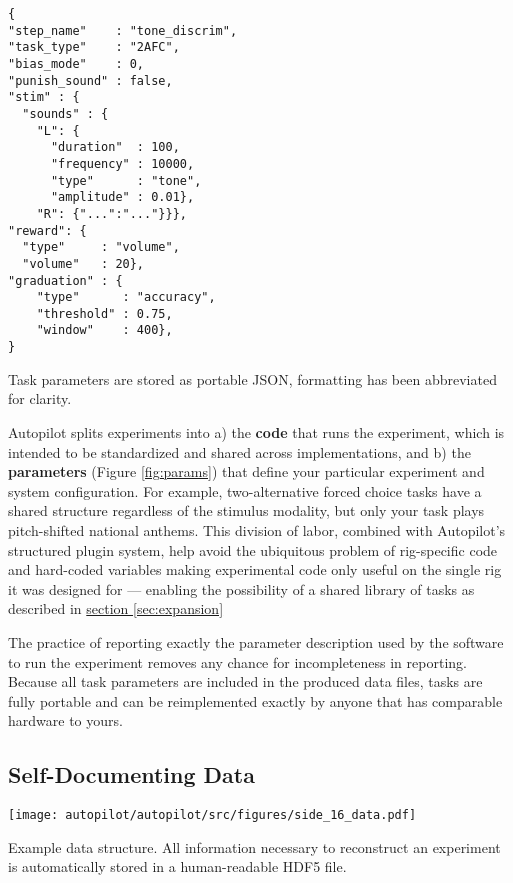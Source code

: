 %
\begin{marginfigure}[1.5cm]
\begin{verbatim}
{
"step_name"    : "tone_discrim",
"task_type"    : "2AFC",
"bias_mode"    : 0,
"punish_sound" : false,
"stim" : {
  "sounds" : {
    "L": {
      "duration"  : 100,
      "frequency" : 10000,
      "type"      : "tone",
      "amplitude" : 0.01},
    "R": {"...":"..."}}},
"reward": {
  "type"     : "volume",
  "volume"   : 20},
"graduation" : {
    "type"      : "accuracy",
    "threshold" : 0.75,
    "window"    : 400},
}
\end{verbatim}
\caption{Task parameters are stored as portable JSON, formatting has been abbreviated for clarity.}
\label{fig:params}
\end{marginfigure}%
%
%
Autopilot splits experiments into a) the \textbf{code} that runs the experiment, which is intended to be standardized and shared across implementations, and b) the \textbf{parameters} (Figure \ref{fig:params}) that define your particular experiment and system configuration. For example, two-alternative forced choice tasks have a shared structure regardless of the stimulus modality, but only your task plays pitch-shifted national anthems. This division of labor, combined with Autopilot's structured plugin system, help avoid the ubiquitous problem of rig-specific code and hard-coded variables making experimental code only useful on the single rig it was designed for --- enabling the possibility of a shared library of tasks as described in \hyperref[sec:expansion]{section \ref{sec:expansion}}%

The practice of reporting exactly the parameter description used by the software to run the experiment removes any chance for incompleteness in reporting. Because all task parameters are included in the produced data files, tasks are fully portable and can be reimplemented exactly by anyone that has comparable hardware to yours. 

\subsection{Self-Documenting Data}
\label{sec:data}

\begin{marginfigure}[1.5cm]
\texttt{[image: autopilot/autopilot/src/figures/side\_16\_data.pdf]}
\caption{Example data structure. All information necessary to reconstruct an experiment is automatically stored in a human-readable HDF5 file.}
\label{fig:datastx}
\end{marginfigure}

